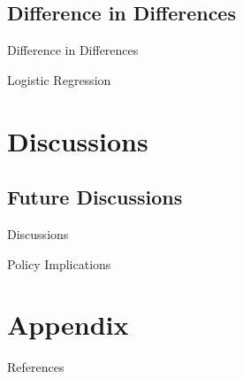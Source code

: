 \documentclass[10pt]{beamer}
\begin{document}
\subsection{Difference in Differences}

\begin{frame}{Difference in Differences}
\small 
\linespread{1.25}

\end{frame}


\begin{frame}{Logistic Regression}

\end{frame}





\section{Discussions}

\subsection{Future Discussions}

\begin{frame}{Discussions}
\linespread{1.5}

\end{frame}


\begin{frame}{Policy Implications}
\linespread{1.5}

\end{frame} 


\begin{frame}
\end{frame} %




\appendix 

\section{Appendix}

\begin{frame}{}
\end{frame}



\begin{frame}[allowframebreaks]{References} 
\footnotesize
	
%
\end{frame}
\end{document}
